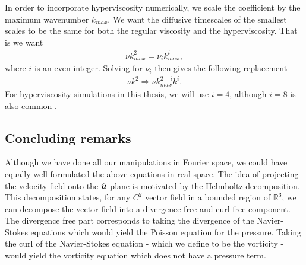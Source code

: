 
In order to incorporate hyperviscosity numerically, we scale the coefficient by the maximum wavenumber $k_{max}$. We want the diffusive timescales of the smallest scales to be the same for both the regular viscosity and the hyperviscosity. That is we want 
\begin{align}
\nu k_{max}^{2} = \nu_{i}k_{max}^{i},
\end{align}
where $i$ is an even integer. Solving for $\nu_{i}$ then gives the following replacement
\begin{align}
\nu k^{2} \Rightarrow \nu k_{max}^{2-i}k^{i}.
\end{align}
For hyperviscosity simulations in this thesis, we will use $i=4$, although $i=8$ is also common \cite{lindborg2006,augier2012}.

\subsection{Concluding remarks}
Although we have done all our manipulations in Fourier space, we could have equally well formulated the above equations in real space. The idea of projecting the velocity field onto the $\hat{\bm{u}}$-plane is motivated by the Helmholtz decomposition. This decomposition states, for any $C^{2}$ vector field in a bounded region of $\mathbb{R}^{3}$, we can decompose the vector field into a divergence-free and curl-free component. The divergence free part corresponds to taking the divergence of the Navier-Stokes equations which would yield the Poisson equation for the pressure. Taking the curl of the Navier-Stokes equation - which we define to be the vorticity - would yield the vorticity equation which does not have a pressure term.


